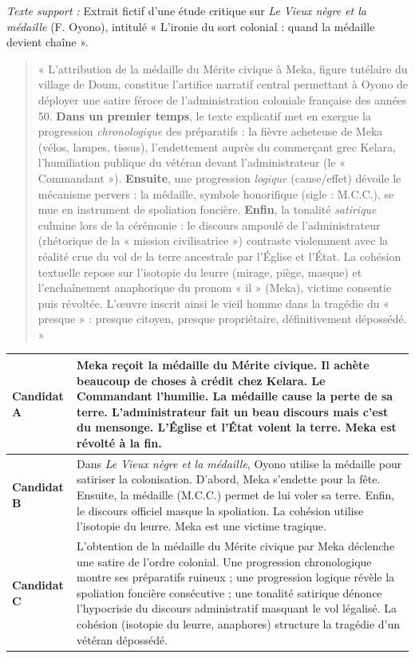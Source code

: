 \documentclass[11pt]{article}
\begin{document}
\begin{exercice}
\textit{Texte support :} Extrait fictif d'une étude critique sur \textit{Le Vieux nègre et la médaille} (F. Oyono), intitulé « L'ironie du sort colonial : quand la médaille devient chaîne ».

\begin{quote}
\small « L'attribution de la médaille du Mérite civique à Meka, figure tutélaire du village de Doum, constitue l'artifice narratif central permettant à Oyono de déployer une satire féroce de l'administration coloniale française des années 50. \textbf{Dans un premier temps}, le texte explicatif met en exergue la progression \textit{chronologique} des préparatifs : la fièvre acheteuse de Meka (vélos, lampes, tissus), l'endettement auprès du commerçant grec Kelara, l'humiliation publique du vétéran devant l'administrateur (le « Commandant »). \textbf{Ensuite}, une progression \textit{logique} (cause/effet) dévoile le mécanisme pervers : la médaille, symbole honorifique (sigle : M.C.C.), se mue en instrument de spoliation foncière. \textbf{Enfin}, la tonalité \textit{satirique} culmine lors de la cérémonie : le discours ampoulé de l'administrateur (rhétorique de la « mission civilisatrice ») contraste violemment avec la réalité crue du vol de la terre ancestrale par l'Église et l'État. La cohésion textuelle repose sur l'isotopie du leurre (mirage, piège, masque) et l'enchaînement anaphorique du pronom « il » (Meka), victime consentie puis révoltée. L'œuvre inscrit ainsi le vieil homme dans la tragédie du « presque » : presque citoyen, presque propriétaire, définitivement dépossédé. »
\end{quote}

\begin{tabularx}{\linewidth}{@{}lX@{}}
\toprule
\textbf{Candidat A} & Meka reçoit la médaille du Mérite civique. Il achète beaucoup de choses à crédit chez Kelara. Le Commandant l'humilie. La médaille cause la perte de sa terre. L'administrateur fait un beau discours mais c'est du mensonge. L'Église et l'État volent la terre. Meka est révolté à la fin. \\
\midrule
\textbf{Candidat B} & Dans \textit{Le Vieux nègre et la médaille}, Oyono utilise la médaille pour satiriser la colonisation. D'abord, Meka s'endette pour la fête. Ensuite, la médaille (M.C.C.) permet de lui voler sa terre. Enfin, le discours officiel masque la spoliation. La cohésion utilise l'isotopie du leurre. Meka est une victime tragique. \\
\midrule
\textbf{Candidat C} & L'obtention de la médaille du Mérite civique par Meka déclenche une satire de l'ordre colonial. Une progression chronologique montre ses préparatifs ruineux ; une progression logique révèle la spoliation foncière consécutive ; une tonalité satirique dénonce l'hypocrisie du discours administratif masquant le vol légalisé. La cohésion (isotopie du leurre, anaphores) structure la tragédie d'un vétéran dépossédé. \\
\bottomrule
\end{tabularx}


\end{exercice}
\end{document}

